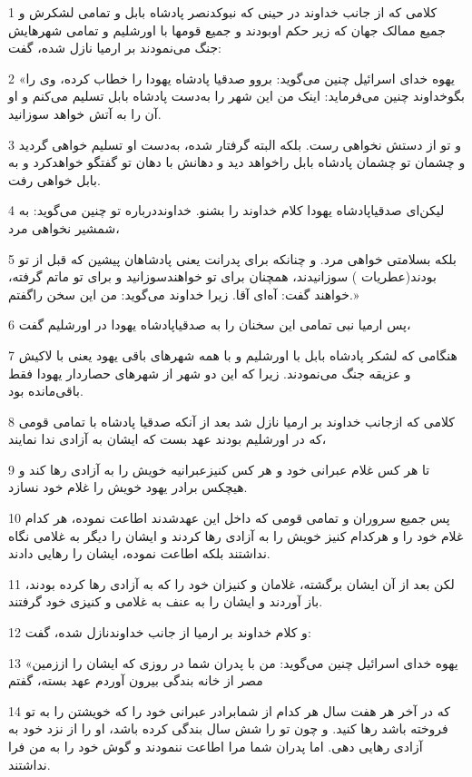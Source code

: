\par 1 کلامی که از جانب خداوند در حینی که نبوکدنصر پادشاه بابل و تمامی لشکرش و جمیع ممالک جهان که زیر حکم اوبودند و جمیع قومها با اورشلیم و تمامی شهرهایش جنگ می‌نمودند بر ارمیا نازل شده، گفت:
\par 2 «یهوه خدای اسرائیل چنین می‌گوید: بروو صدقیا پادشاه یهودا را خطاب کرده، وی را بگوخداوند چنین می‌فرماید: اینک من این شهر را به‌دست پادشاه بابل تسلیم می‌کنم و او آن را به آتش خواهد سوزانید.
\par 3 و تو از دستش نخواهی رست. بلکه البته گرفتار شده، به‌دست او تسلیم خواهی گردید و چشمان تو چشمان پادشاه بابل راخواهد دید و دهانش با دهان تو گفتگو خواهدکرد و به بابل خواهی رفت.
\par 4 لیکن‌ای صدقیاپادشاه یهودا کلام خداوند را بشنو. خداونددرباره تو چنین می‌گوید: به شمشیر نخواهی مرد،
\par 5 بلکه بسلامتی خواهی مرد. و چنانکه برای پدرانت یعنی پادشاهان پیشین که قبل از تو بودند(عطریات ) سوزانیدند، همچنان برای تو خواهندسوزانید و برای تو ماتم گرفته، خواهند گفت: آه‌ای آقا. زیرا خداوند می‌گوید: من این سخن راگفتم.»
\par 6 پس ارمیا نبی تمامی این سخنان را به صدقیاپادشاه یهودا در اورشلیم گفت،
\par 7 هنگامی که لشکر پادشاه بابل با اورشلیم و با همه شهرهای باقی یهود یعنی با لاکیش و عزیقه جنگ می‌نمودند. زیرا که این دو شهر از شهرهای حصاردار یهودا فقط باقی‌مانده بود.
\par 8 کلامی که ازجانب خداوند بر ارمیا نازل شد بعد از آنکه صدقیا پادشاه با تمامی قومی که در اورشلیم بودند عهد بست که ایشان به آزادی ندا نمایند،
\par 9 تا هر کس غلام عبرانی خود و هر کس کنیزعبرانیه خویش را به آزادی رها کند و هیچکس برادر یهود خویش را غلام خود نسازد.
\par 10 پس جمیع سروران و تمامی قومی که داخل این عهدشدند اطاعت نموده، هر کدام غلام خود را و هرکدام کنیز خویش را به آزادی رها کردند و ایشان را دیگر به غلامی نگاه نداشتند بلکه اطاعت نموده، ایشان را رهایی دادند.
\par 11 لکن بعد از آن ایشان برگشته، غلامان و کنیزان خود را که به آزادی رها کرده بودند، باز آوردند و ایشان را به عنف به غلامی و کنیزی خود گرفتند.
\par 12 و کلام خداوند بر ارمیا از جانب خداوندنازل شده، گفت:
\par 13 «یهوه خدای اسرائیل چنین می‌گوید: من با پدران شما در روزی که ایشان را اززمین مصر از خانه بندگی بیرون آوردم عهد بسته، گفتم
\par 14 که در آخر هر هفت سال هر کدام از شمابرادر عبرانی خود را که خویشتن را به تو فروخته باشد رها کنید. و چون تو را شش سال بندگی کرده باشد، او را از نزد خود به آزادی رهایی دهی. اما پدران شما مرا اطاعت ننمودند و گوش خود را به من فرا نداشتند.
